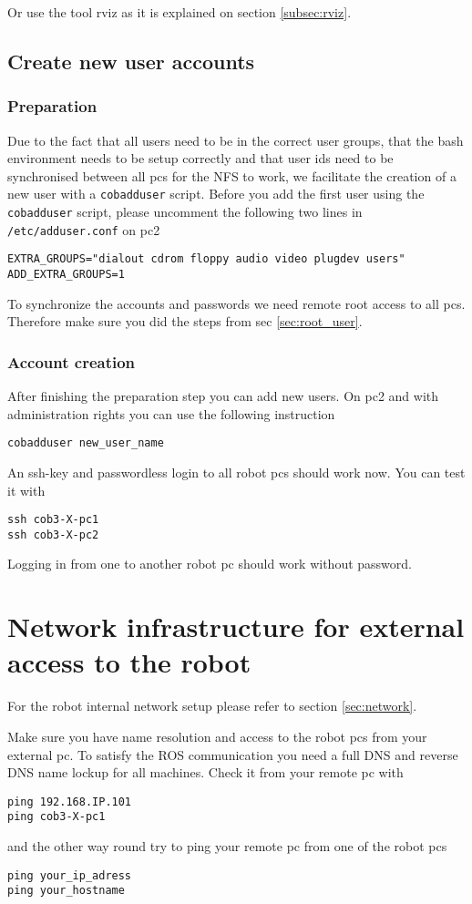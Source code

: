 Or use the tool rviz as it is explained on section \ref{subsec:rviz}.

\subsection{Create new user accounts}
\subsubsection{Preparation}
\label{sec:account}
Due to the fact that all users need to be in the correct user groups, that the bash environment needs to be setup correctly and that user ids need to be synchronised between all pcs for the NFS to work, we facilitate the creation of a new user with a \texttt{cobadduser} script. Before you add the first user using the \texttt{cobadduser} script, please uncomment the following two lines in \texttt{/etc/adduser.conf} on pc2
\begin{lstlisting}
EXTRA_GROUPS="dialout cdrom floppy audio video plugdev users"
ADD_EXTRA_GROUPS=1
\end{lstlisting}

To synchronize the accounts and passwords we need remote root access to all pcs. Therefore make sure you did the steps from sec \ref{sec:root_user}.

\subsubsection{Account creation}
After finishing the preparation step you can add new users. On pc2 and with administration rights you can use the following instruction
\begin{lstlisting}
cobadduser new_user_name
\end{lstlisting}

An ssh-key and passwordless login to all robot pcs should work now. You can test it with
\begin{lstlisting}
ssh cob3-X-pc1
ssh cob3-X-pc2
\end{lstlisting}
Logging in from one to another robot pc should work without password.

\section{Network infrastructure for external access to the robot}
For the robot internal network setup please refer to section \ref{sec:network}.

Make sure you have name resolution and access to the robot pcs from your external pc. To satisfy the ROS communication you need a full DNS and reverse DNS name lockup for all machines. Check it from your remote pc with
\begin{lstlisting}
ping 192.168.IP.101
ping cob3-X-pc1
\end{lstlisting}
and the other way round try to ping your remote pc from one of the robot pcs
\begin{lstlisting}
ping your_ip_adress
ping your_hostname
\end{lstlisting}

